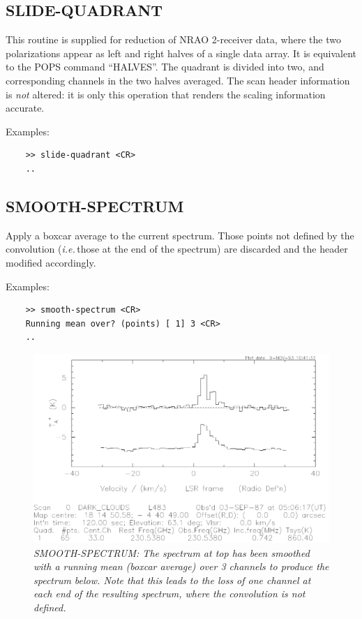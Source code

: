 \documentclass[11pt,twoside]{report}
\newcommand{\ie}{{\it i.e.\,}}
\begin{document}
\subsection{SLIDE-QUADRANT} 

This routine is supplied for reduction of NRAO 2-receiver data, where
the two polarizations appear as left and right halves of a single data
array. It is equivalent to the POPS command ``HALVES''. The quadrant is
divided into two, and corresponding channels in the two halves averaged.
The scan header information is {\em not} altered: it is only this
operation that renders the scaling information accurate.

Examples:
\begin{verbatim}
    >> slide-quadrant <CR>
    ..
\end{verbatim}

\subsection{SMOOTH-SPECTRUM} 

Apply a boxcar average to the current spectrum. Those points not defined
by the convolution (\ie those at the end of the spectrum) are discarded and
the header modified accordingly.

Examples:
\begin{verbatim}
    >> smooth-spectrum <CR>
    Running mean over? (points) [ 1] 3 <CR>
    ..
\end{verbatim}

\begin{figure}[htbp]
\begin{center}
\includegraphics[scale=0.65]{smooth}
\protect\parbox{5.5in}
{\caption[SMOOTH]
{\sl
SMOOTH-SPECTRUM: The spectrum at top has been smoothed with a running
mean (boxcar average) over 3 channels to produce the spectrum below.
Note that this leads to the loss of one channel at each end of the
resulting spectrum, where the convolution is not defined.
\label{SMOOTH}
}
}
\end{center}
\end{figure}
\end{document}

